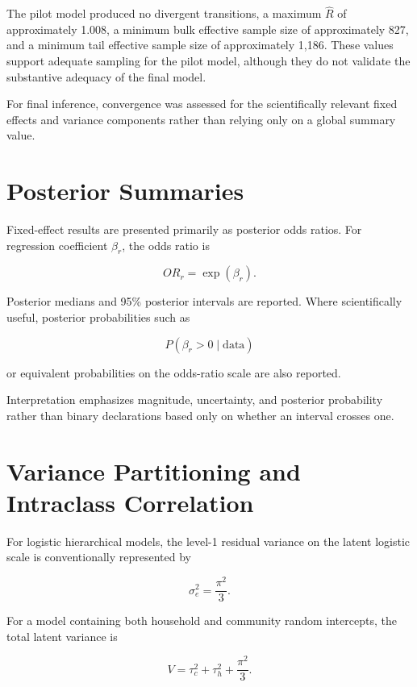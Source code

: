 The pilot model produced no divergent transitions, a maximum $\hat{R}$ of approximately 1.008, a minimum bulk effective sample size of approximately 827, and a minimum tail effective sample size of approximately 1,186. These values support adequate sampling for the pilot model, although they do not validate the substantive adequacy of the final model.

For final inference, convergence was assessed for the scientifically relevant fixed effects and variance components rather than relying only on a global summary value.

\section{Posterior Summaries}

Fixed-effect results are presented primarily as posterior odds ratios. For regression coefficient $\beta_r$, the odds ratio is

\begin{equation}
OR_r = \exp(\beta_r).
\end{equation}

Posterior medians and 95\% posterior intervals are reported. Where scientifically useful, posterior probabilities such as

\begin{equation}
P(\beta_r > 0 \mid \text{data})
\end{equation}

or equivalent probabilities on the odds-ratio scale are also reported.

Interpretation emphasizes magnitude, uncertainty, and posterior probability rather than binary declarations based only on whether an interval crosses one.

\section{Variance Partitioning and Intraclass Correlation}

For logistic hierarchical models, the level-1 residual variance on the latent logistic scale is conventionally represented by

\begin{equation}
\sigma_e^2 = \frac{\pi^2}{3}.
\end{equation}

For a model containing both household and community random intercepts, the total latent variance is

\begin{equation}
V =
\tau_c^2
+
\tau_h^2
+
\frac{\pi^2}{3}.
\end{equation}


